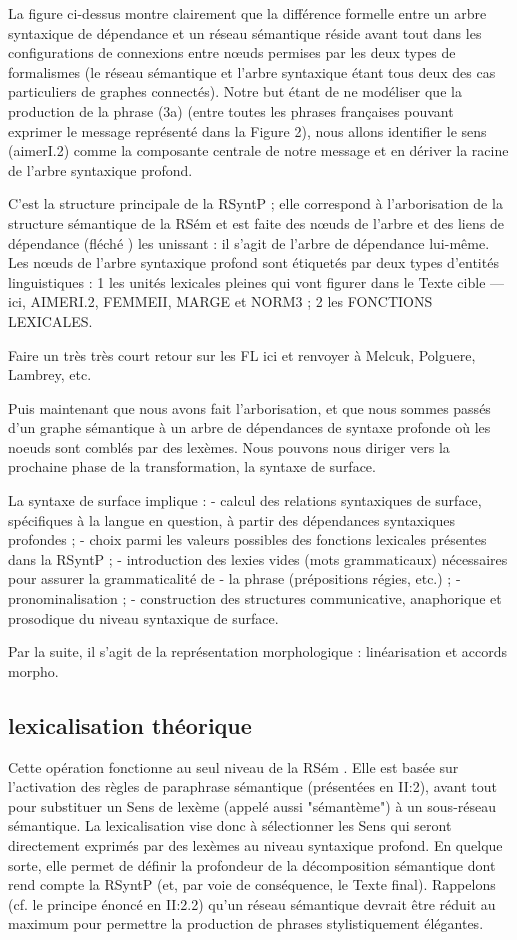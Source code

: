 {La figure ci-dessus montre clairement que la différence formelle entre un arbre syntaxique de dépendance et un réseau sémantique réside avant tout dans les configurations de connexions entre nœuds permises par les deux types de formalismes (le réseau sémantique et l'arbre syntaxique étant tous deux des cas particuliers de graphes connectés). Notre but étant de ne modéliser que la production de la phrase (3a) (entre toutes les phrases françaises pouvant exprimer le message représenté dans la Figure 2), nous allons identifier le sens (aimerI.2) comme la composante centrale de notre message et en dériver la racine de l'arbre syntaxique profond.

C'est la structure principale de la RSyntP ; elle correspond à l'arborisation de la structure sémantique de la RSém et est faite des nœuds de l'arbre et des liens de dépendance (fléché ) les unissant : il s'agit de l'arbre de dépendance lui-même. Les nœuds de l'arbre syntaxique profond sont étiquetés par deux types d'entités linguistiques : 1 les unités lexicales pleines qui vont figurer dans le Texte cible — ici, AIMERI.2, FEMMEII, MARGE et NORM3 ; 2 les FONCTIONS LEXICALES.

Faire un très très court retour sur les FL ici et renvoyer à Melcuk, Polguere, Lambrey, etc.

Puis maintenant que nous avons fait l'arborisation, et que nous sommes passés d'un graphe sémantique à un arbre de dépendances de syntaxe profonde où les noeuds sont comblés par des lexèmes. Nous pouvons nous diriger vers la prochaine phase de la transformation, la syntaxe de surface. 

La syntaxe de surface implique :
- calcul des relations syntaxiques de surface, spécifiques à la langue en question, à partir des
dépendances syntaxiques profondes ;
- choix parmi les valeurs possibles des fonctions lexicales présentes dans la RSyntP ;
- introduction des lexies vides (mots grammaticaux) nécessaires pour assurer la grammaticalité de
- la phrase (prépositions régies, etc.) ;
- pronominalisation ;
- construction des structures communicative, anaphorique et prosodique du niveau syntaxique de
surface.

Par la suite, il s'agit de la représentation morphologique : 	linéarisation et accords morpho.

\subsection{lexicalisation théorique}
Cette opération fonctionne au seul niveau de la RSém \citep{PolguereStructurationmisejeu1990}. Elle est basée sur l'activation des règles de paraphrase sémantique (présentées en II:2), avant tout pour substituer un Sens de lexème (appelé aussi "sémantème") à un sous-réseau sémantique. La lexicalisation vise donc à sélectionner les Sens qui seront directement exprimés par des lexèmes au niveau syntaxique  profond. En quelque sorte, elle permet de définir la profondeur de la décomposition sémantique dont rend compte la RSyntP (et, par voie de conséquence, le Texte final). Rappelons (cf. le principe énoncé en II:2.2) qu'un réseau sémantique devrait être réduit au maximum pour permettre la production de phrases stylistiquement élégantes.
}

